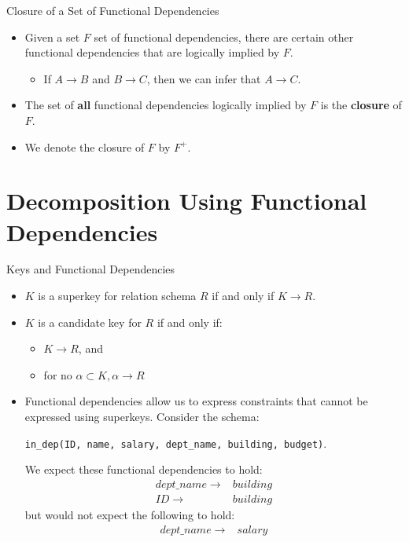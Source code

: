 \documentclass{beamer}
\begin{document}
\begin{frame}{Closure of a Set of Functional Dependencies}
    \begin{itemize}
        \item Given a set $F$ set of functional dependencies, there are certain other functional dependencies that are logically implied by $F$.
        \begin{itemize}
            \item If $A \rightarrow B$ and $B \rightarrow C$, then we can infer that $A \rightarrow C$.
        \end{itemize}
        \item The set of \textbf{all} functional dependencies logically implied by $F$ is the \textbf{closure} of $F$.
        \item We denote the closure of $F$ by $F^+$.
    \end{itemize}
\end{frame}

\section{Decomposition Using Functional Dependencies}

\begin{frame}{Keys and Functional Dependencies}
    \begin{itemize}
        \item $K$ is a superkey for relation schema $R$ if and only if $K \rightarrow R$.
        \item $K$ is a candidate key for $R$ if and only if:
        \begin{itemize}
            \item $K \rightarrow R$, and
            \item for no $\alpha \subset K, \alpha \rightarrow R$
        \end{itemize}
        \item Functional dependencies allow us to express constraints that cannot be expressed using superkeys. Consider the schema:
            \begin{center}
                \texttt{\footnotesize in\_dep(ID, name, salary, dept\_name, building, budget)}.
            \end{center}
        We expect these functional dependencies to hold:
            \begin{equation*}
                \begin{align*}
                    dept\_name \rightarrow& building \\
                    ID \rightarrow& building
                \end{align*}
            \end{equation*}
        but would not expect the following to hold:
            \begin{equation*}
                \begin{align*}
                    dept\_name \rightarrow& salary
                \end{align*}
            \end{equation*}
    \end{itemize}
\end{frame}
\end{document}
